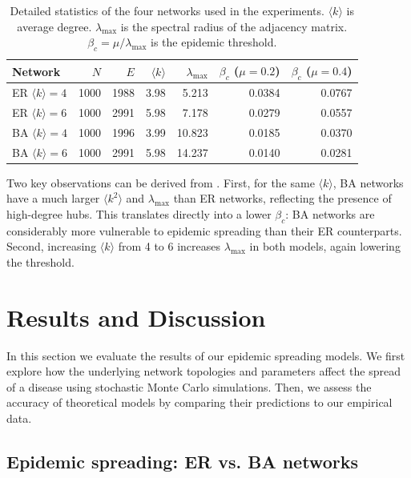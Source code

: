 \documentclass{article}
\begin{document}
\begin{table}[ht]
\centering
\begin{tabular}{lrrrrrr}
\toprule
Network & $N$ & $E$ & $\langle k \rangle$ & $\lambda_{\max}$ & $\beta_c$ ($\mu{=}0.2$) & $\beta_c$ ($\mu{=}0.4$) \\
\midrule
ER $\langle k\rangle=4$ & 1000 & 1988 & 3.98 & 5.213 & 0.0384 & 0.0767 \\
ER $\langle k\rangle=6$ & 1000 & 2991 & 5.98 & 7.178 & 0.0279 & 0.0557 \\
BA $\langle k\rangle=4$ & 1000 & 1996 & 3.99 & 10.823 & 0.0185 & 0.0370 \\
BA $\langle k\rangle=6$ & 1000 & 2991 & 5.98 & 14.237 & 0.0140 & 0.0281 \\
\bottomrule
\end{tabular}
\caption{Detailed statistics of the four networks used in the experiments. $\langle k \rangle$ is average degree. $\lambda_{\max}$ is the spectral radius of the adjacency matrix. $\beta_c = \mu / \lambda_{\max}$ is the epidemic threshold.}
\label{tab:networks}
\end{table}

Two key observations can be derived from . First, for the same $\langle k \rangle$, BA networks have a much larger $\langle k^2 \rangle$ and $\lambda_{\max}$ than ER networks, reflecting the presence of high-degree hubs. This translates directly into a lower $\beta_c$: BA networks are considerably more vulnerable to epidemic spreading than their ER counterparts. Second, increasing $\langle k \rangle$ from 4 to 6 increases $\lambda_{\max}$ in both models, again lowering the threshold.

\section{Results and Discussion}

In this section we evaluate the results of our epidemic spreading models. We first explore how the underlying network topologies and parameters affect the spread of a disease using stochastic Monte Carlo simulations. Then, we assess the accuracy of theoretical models by comparing their predictions to our empirical data.

\subsection{Epidemic spreading: ER vs. BA networks}
\end{document}
